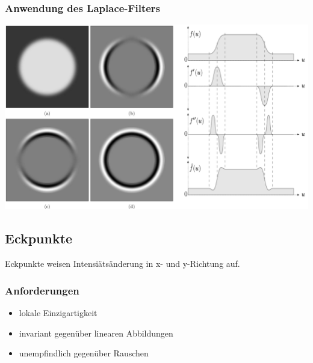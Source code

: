 \documentclass[10pt]{article}
\begin{document}
\subsubsection{Anwendung des Laplace-Filters}
\begin{center}
	\includegraphics[scale=0.3]{laplace-filter.png}
\end{center}

\subsection{Eckpunkte}
Eckpunkte weisen Intensiätsänderung in x- und y-Richtung auf. 
\subsubsection{Anforderungen}
\begin{itemize}
	\item lokale Einzigartigkeit
	\item invariant gegenüber linearen Abbildungen
	\item unempfindlich gegenüber Rauschen
\end{itemize}
\end{document}
